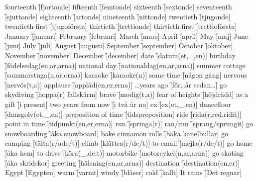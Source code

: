 \begin{questions}
\begin{multicols}{2}
        \question fourteenth \f[fjortonde]
        \question fifteenth \f[femtonde]
        \question sixteenth \f[sextonde]
        \question seventeenth \f[sjuttonde]
        \question eighteenth \f[artonde]
        \question nineteenth \f[nittonde]
        \question twentieth \f[tjugonde]
        \question twentieth-first \f[tjugoförsta]
        \question thirtieth \f[trettionde]
        \question thirtieth-first \f[trettioförsta]
        \question January \f[januari]
        \question February \f[februari]
        \question March \f[mars]
        \question April \f[april]
        \question May \f[maj]
        \question June \f[juni]
        \question July \f[juli]
        \question August \f[augusti]
        \question September \f[september]
        \question October \f[oktober]
        \question November \f[november]
        \question December \f[december]
        \question date \f[datum(et,\_,en)]
        \question birthday \f[födelsedag(en,ar,arna)]
        \question national day \f[nationaldag(en,ar,arna)]
        \question summer cottage \f[sommarstuga(n,or,orna)]
        \question karaoke \f[karaoke(n)]
        \question some time \f[någon gång]
        \question nervous \f[nervös(t,a)]
        \question applause \f[applåd(en,er,erna)]
        \question \ldots years ago \f[för\ldots år sedan\ldots]
        \question go skydiving \f[hoppa(r) fallskärm]
        \question brave \f[modig(t,a)]
        \question fear of heights \f[höjdrädd]
        \question as a gift \f[i present]
        \question two years from now \f[i två år nu]
        \question ex \f[ex(et,\_,en)]
        \question dancefloor \f[dansgolv(et,\_,en)]
        \question preposition of time \f[tidspreposition]
        \question ride \f[rida(r,red,ridit)]
        \question point in time \f[tidpunkt(en,er,erna)]
        \question run \f[springa(r)]
        \question ran/run \f[sprang/sprungit]
        \question go snowboarding \f[åka snowboard]
        \question bake cinnamon rolls \f[baka kanelbullar]
        \question go camping \f[tälta(r/ade/t)]
        \question climb \f[klättra(r/de/t)]
        \question to email \f[mejla(r/de/t)]
        \question go home \f[åka hem]
        \question to drive \f[köra(\_,de,t)]
        \question motorbike \f[motorcykel(n,ar,arna)]
        \question go skating \f[åka skridskor]
        \question greeting \f[hälsning(en,ar,arna)]
        \question destination \f[destination(en,er)]
        \question Egypt \f[Egypten]
        \question warm \f[varmt]
        \question windy \f[blåser]
        \question cold \f[kallt]
        \question It rains \f[Det regnar]

\end{multicols}
\end{questions}

